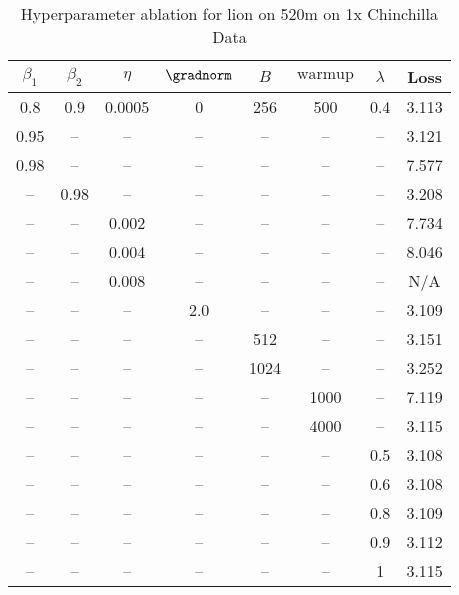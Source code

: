 \begin{table}[h!]
\centering
\caption{Hyperparameter ablation for lion on 520m on 1x Chinchilla Data}
\label{tab:ablation_lion_520m_on_1x_chinchilla_data}
\begin{tabular}{cccccccc}
\toprule
$\beta_1$ & $\beta_2$ & $\eta$ & $\gradnorm$ & $B$ & $\mathrm{warmup}$ & $\lambda$ & Loss \\
\midrule
0.8 & 0.9 & 0.0005 & 0 & 256 & 500 & 0.4 & 3.113 \\
\midrule
0.95 & -- & -- & -- & -- & -- & -- & 3.121 \\
0.98 & -- & -- & -- & -- & -- & -- & 7.577 \\
-- & 0.98 & -- & -- & -- & -- & -- & 3.208 \\
-- & -- & 0.002 & -- & -- & -- & -- & 7.734 \\
-- & -- & 0.004 & -- & -- & -- & -- & 8.046 \\
-- & -- & 0.008 & -- & -- & -- & -- & N/A \\
-- & -- & -- & 2.0 & -- & -- & -- & 3.109 \\
-- & -- & -- & -- & 512 & -- & -- & 3.151 \\
-- & -- & -- & -- & 1024 & -- & -- & 3.252 \\
-- & -- & -- & -- & -- & 1000 & -- & 7.119 \\
-- & -- & -- & -- & -- & 4000 & -- & 3.115 \\
-- & -- & -- & -- & -- & -- & 0.5 & 3.108 \\
-- & -- & -- & -- & -- & -- & 0.6 & 3.108 \\
-- & -- & -- & -- & -- & -- & 0.8 & 3.109 \\
-- & -- & -- & -- & -- & -- & 0.9 & 3.112 \\
-- & -- & -- & -- & -- & -- & 1 & 3.115 \\
\bottomrule
\end{tabular}
\end{table}

